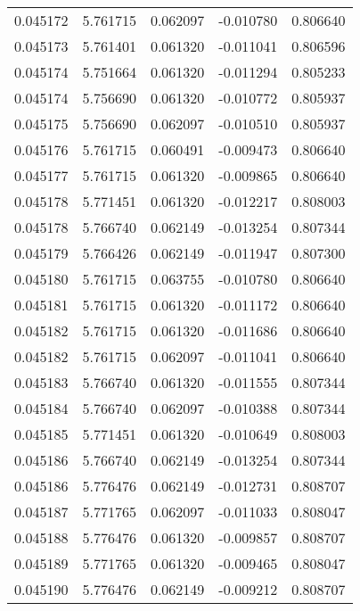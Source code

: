 \begin{tabular}{lrrrr}
0.045172    &  5.761715 &  0.062097 & -0.010780 &             0.806640 \\
0.045173    &  5.761401 &  0.061320 & -0.011041 &             0.806596 \\
0.045174    &  5.751664 &  0.061320 & -0.011294 &             0.805233 \\
0.045174    &  5.756690 &  0.061320 & -0.010772 &             0.805937 \\
0.045175    &  5.756690 &  0.062097 & -0.010510 &             0.805937 \\
0.045176    &  5.761715 &  0.060491 & -0.009473 &             0.806640 \\
0.045177    &  5.761715 &  0.061320 & -0.009865 &             0.806640 \\
0.045178    &  5.771451 &  0.061320 & -0.012217 &             0.808003 \\
0.045178    &  5.766740 &  0.062149 & -0.013254 &             0.807344 \\
0.045179    &  5.766426 &  0.062149 & -0.011947 &             0.807300 \\
0.045180    &  5.761715 &  0.063755 & -0.010780 &             0.806640 \\
0.045181    &  5.761715 &  0.061320 & -0.011172 &             0.806640 \\
0.045182    &  5.761715 &  0.061320 & -0.011686 &             0.806640 \\
0.045182    &  5.761715 &  0.062097 & -0.011041 &             0.806640 \\
0.045183    &  5.766740 &  0.061320 & -0.011555 &             0.807344 \\
0.045184    &  5.766740 &  0.062097 & -0.010388 &             0.807344 \\
0.045185    &  5.771451 &  0.061320 & -0.010649 &             0.808003 \\
0.045186    &  5.766740 &  0.062149 & -0.013254 &             0.807344 \\
0.045186    &  5.776476 &  0.062149 & -0.012731 &             0.808707 \\
0.045187    &  5.771765 &  0.062097 & -0.011033 &             0.808047 \\
0.045188    &  5.776476 &  0.061320 & -0.009857 &             0.808707 \\
0.045189    &  5.771765 &  0.061320 & -0.009465 &             0.808047 \\
0.045190    &  5.776476 &  0.062149 & -0.009212 &             0.808707 \\

\end{tabular}
